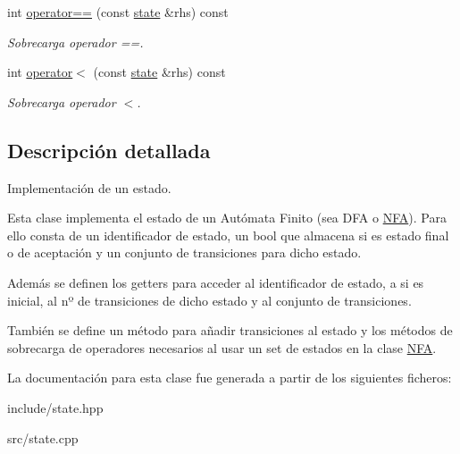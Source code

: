 \begin{DoxyCompactItemize}
int \mbox{\hyperlink{classstate_a11f919a4500e40494d3f24f12e1d0e67}{operator==}} (const \mbox{\hyperlink{classstate}{state}} \&rhs) const
\begin{DoxyCompactList}\small\item\em Sobrecarga operador ==. \end{DoxyCompactList}\item 
\mbox{\label{classstate_a0f39dd40c21202de8607a230d26dbf90}} 
int \mbox{\hyperlink{classstate_a0f39dd40c21202de8607a230d26dbf90}{operator$<$}} (const \mbox{\hyperlink{classstate}{state}} \&rhs) const
\begin{DoxyCompactList}\small\item\em Sobrecarga operador $<$. \end{DoxyCompactList}\end{DoxyCompactItemize}


\subsection{Descripción detallada}
Implementación de un estado. 

Esta clase implementa el estado de un Autómata Finito (sea D\+FA o \mbox{\hyperlink{class_n_f_a}{N\+FA}}). Para ello consta de un identificador de estado, un bool que almacena si es estado final o de aceptación y un conjunto de transiciones para dicho estado.

Además se definen los getters para acceder al identificador de estado, a si es inicial, al nº de transiciones de dicho estado y al conjunto de transiciones.

También se define un método para añadir transiciones al estado y los métodos de sobrecarga de operadores necesarios al usar un set de estados en la clase \mbox{\hyperlink{class_n_f_a}{N\+FA}}. 

La documentación para esta clase fue generada a partir de los siguientes ficheros\+:\begin{DoxyCompactItemize}
\item 
include/state.\+hpp\item 
src/state.\+cpp\end{DoxyCompactItemize}
